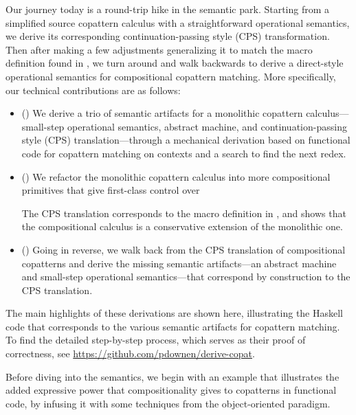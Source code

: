 \documentclass[sigplan,screen]{acmart}
\begin{document}
Our journey today is a round-trip hike in the semantic park.  Starting from a
simplified source copattern calculus with a straightforward operational
semantics, we derive its corresponding continuation-passing style (CPS)
transformation.  Then after making a few adjustments generalizing it to match
the macro definition found in \cite{CoScheme}, we turn around and walk backwards
to derive a direct-style operational semantics for compositional copattern
matching.  More specifically, our technical contributions are as follows:
\begin{itemize}
\item () We derive a trio of semantic artifacts for a
  monolithic copattern calculus---small-step operational semantics, abstract
  machine, and continuation-passing style (CPS) translation---through a
  mechanical derivation based on functional code for copattern matching on
  contexts and a search to find the next redex.
\item () We refactor the monolithic copattern calculus into
  more compositional primitives that give first-class control over
  The CPS translation corresponds to the macro definition in \cite{CoScheme},
  and shows that the compositional calculus is a conservative extension of the
  monolithic one.
\item () Going in reverse, we walk back from the CPS
  translation of compositional copatterns and derive the missing semantic
  artifacts---an abstract machine and small-step operational semantics---that
  correspond by construction to the CPS translation.
\end{itemize}
The main highlights of these derivations are shown here, illustrating the
Haskell code that corresponds to the various semantic artifacts for copattern
matching.  To find the detailed step-by-step process, which serves as their
proof of correctness, see \url{https://github.com/pdownen/derive-copat}.

Before diving into the semantics, we begin with an example that illustrates the
added expressive power that compositionality gives to copatterns in functional
code, by infusing it with some techniques from the object-oriented paradigm.
\end{document}
